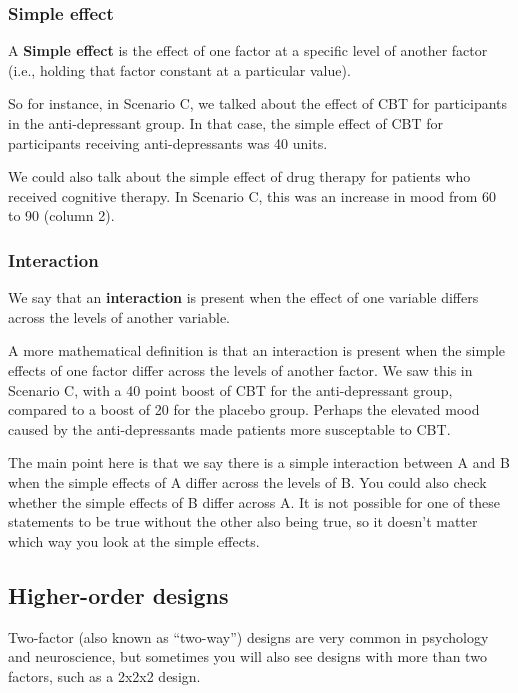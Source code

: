 \documentclass[]{book}
\begin{document}
\hypertarget{simple-effect}{%
\subsubsection{Simple effect}\label{simple-effect}}

A \textbf{Simple effect} is the effect of one factor at a specific level of another factor (i.e., holding that factor constant at a particular value).

So for instance, in Scenario C, we talked about the effect of CBT for participants in the anti-depressant group. In that case, the simple effect of CBT for participants receiving anti-depressants was 40 units.

We could also talk about the simple effect of drug therapy for patients who received cognitive therapy. In Scenario C, this was an increase in mood from 60 to 90 (column 2).

\hypertarget{interaction}{%
\subsubsection{Interaction}\label{interaction}}

We say that an \textbf{interaction} is present when the effect of one variable differs across the levels of another variable.

A more mathematical definition is that an interaction is present when the simple effects of one factor differ across the levels of another factor. We saw this in Scenario C, with a 40 point boost of CBT for the anti-depressant group, compared to a boost of 20 for the placebo group. Perhaps the elevated mood caused by the anti-depressants made patients more susceptable to CBT.

The main point here is that we say there is a simple interaction between A and B when the simple effects of A differ across the levels of B. You could also check whether the simple effects of B differ across A. It is not possible for one of these statements to be true without the other also being true, so it doesn't matter which way you look at the simple effects.

\hypertarget{higher-order-designs}{%
\subsection{Higher-order designs}\label{higher-order-designs}}

Two-factor (also known as ``two-way'') designs are very common in psychology and neuroscience, but sometimes you will also see designs with more than two factors, such as a 2x2x2 design.
\end{document}
